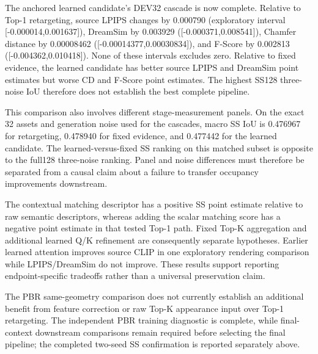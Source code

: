 \documentclass[10pt]{article}
\begin{document}
The anchored learned candidate's DEV32 cascade is now complete. Relative to
Top-1 retargeting, source LPIPS changes by 0.000790 (exploratory interval
[-0.000014,0.001637]), DreamSim by 0.003929 ([-0.000371,0.008541]),
Chamfer distance by 0.00008462 ([-0.00014377,0.00030834]), and F-Score
by 0.002813 ([-0.004362,0.010418]). None of these intervals excludes zero.
Relative to fixed evidence, the learned candidate has better source LPIPS
and DreamSim point estimates but worse CD and F-Score point estimates.
The highest SS128 three-noise IoU therefore does not establish the best
complete pipeline.

This comparison also involves different stage-measurement panels. On the
exact 32 assets and generation noise used for the cascades, macro SS IoU is
0.476967 for retargeting, 0.478940 for fixed evidence, and 0.477442 for the
learned candidate. The learned-versus-fixed SS ranking on this matched subset
is opposite to the full128 three-noise ranking. Panel and noise differences
must therefore be separated from a causal claim about a failure to transfer
occupancy improvements downstream.

The contextual matching descriptor has a positive SS point estimate relative
to raw semantic descriptors, whereas adding the scalar matching score has a
negative point estimate in that tested Top-1 path. Fixed Top-K aggregation and
additional learned Q/K refinement are consequently separate hypotheses.
Earlier learned attention improves source CLIP in one exploratory rendering
comparison while LPIPS/DreamSim do not improve. These results support reporting
endpoint-specific tradeoffs rather than a universal preservation claim.

The PBR same-geometry comparison does not currently establish an additional
benefit from feature correction or raw Top-K appearance input over Top-1
retargeting. The independent PBR training diagnostic is complete, while
final-context downstream comparisons remain required before selecting the
final pipeline; the completed two-seed SS confirmation is reported separately
above.


\end{document}
